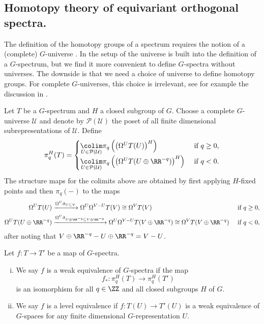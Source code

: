\subsection{Homotopy theory of equivariant orthogonal spectra.}
The definition of the homotopy groups of a spectrum requires the notion of a 
(complete) $G$-universe \cite[Definition~II.2.2, \pno~30]{mandellmay}.
In the setup of \cite{mandellmay} the universe is built into the definition
of a $G$-spectrum, but we find it more convenient to define $G$-spectra
without universes. The downside is that we need a choice of universe
to define homotopy groups. For complete $G$-universes, this choice is
irrelevant, see for example the discussion in \cite[\pno~1510-1511]{rvadams}.
\begin{mydef}
Let $T$ be a $G$-spectrum and $H$ a closed subgroup of $G$. Choose
a complete $G$-universe $\mathcal{U}$ and denote by $\mathcal{P}(\mathcal{U})$
the poset of all finite dimensional subrepresentations of $\mathcal{U}$. Define
\begin{equation}\label{eq:equivarianthomotopygroup}
\pi_q^H(T) = 
\begin{cases}
\underset{U\in \mathcal{P}(\mathcal{U})}{\colim} \pi_q\left(\left(\Omega^UT(U)\right)^H\right) &\text{ if } q\ge 0,\\
\underset{U\in \mathcal{P}(\mathcal{U})}{\colim} \pi_q\left(\left(\Omega^UT(U\oplus \RR^{-q})\right)^H\right) &\text{ if } q< 0.
\end{cases}
\end{equation}
The structure maps for the colimits above are obtained by first applying $H$-fixed points and then $\pi_q(-)$
to the maps
\begin{align}
\Omega^UT(U)&\xrightarrow{\Omega^U \tilde \sigma_{U\subseteq V}} \Omega^U\Omega^{V-U} T(V)\cong \Omega^{V} T(V)
&\text{ if } q\ge 0,\label{eq:homotopygroupstructuremap1}\\
\Omega^UT(U\oplus \RR^{-q})&\xrightarrow{\Omega^U \tilde \sigma_{U\oplus \RR^{-q}\subseteq V\oplus \RR^{-q}}} 
\Omega^U\Omega^{V-U} T(V\oplus \RR^{-q})\cong \Omega^{V} T(V\oplus \RR^{-q})
&\text{ if } q<0 \label{eq:homotopygroupstructuremap2},
\end{align}
after noting that $V\oplus \RR^{-q}-U\oplus \RR^{-q} = V-U$.
\end{mydef}
\begin{mydef}
Let $f:T\to T'$ be a map of $G$-spectra.
\begin{enumerate}[(i)]
\item We say $f$ is a weak equivalence of $G$-spectra
if the map
\[
f_\ast:\pi_q^H(T)\to \pi_q^H(T')
\]
is an isomorphism for all $q\in \ZZ$ and all closed subgroups $H$
of $G$.
\item We say $f$ is a level equivalence if $f:T(U)\to T'(U)$
is a weak equivalence of $G$-spaces for any finite dimensional
$G$-representation $U$.
\end{enumerate}
\end{mydef}
